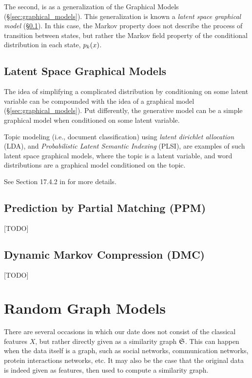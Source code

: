 The second, is as a generalization of the Graphical Models (\S\ref{sec:graphical_models}). 
This generalization is known a \emph{latent space graphical model} (\S\ref{sec:latent_graphical}). 
In this case, the Markov property does not describe the process of transition between states, but rather the Markov field property of the conditional distribution in each state, $p_k(x)$. 




\subsection{Latent Space Graphical Models}
\label{sec:latent_graphical}

The idea of simplifying a complicated distribution by conditioning on some latent variable can be compounded with the idea of a graphical model (\S\ref{sec:graphical_models}). 
Put differently, the generative model can be a simple graphical model when conditioned on some latent variable.

Topic modeling (i.e., document classification) using \emph{latent dirichlet allocation} (LDA), and  \emph{Probabilistic Latent Semantic Indexing} (PLSI), are examples of such latent space graphical models, where the topic is a latent variable, and word distributions are a graphical model conditioned on the topic.

See Section 17.4.2 in \cite{hastie_elements_2003} for more details.



\subsection{Prediction by Partial Matching (PPM)}
\label{sec:ppm}
[TODO]

\subsection{Dynamic Markov Compression (DMC)}
\label{sec:dmc}
[TODO]





\section{Random Graph Models}
\label{sec:random_graphs}

There are several occasions in which our date does not consist of the classical features $X$, but rather directly given as a similarity graph $\mathfrak{S}$. This can happen when the data itself is a graph, such as social networks, communication networks, protein interactions networks, etc. 
It may also be the case that the original data is indeed given as features, then used to compute a similarity graph. 

